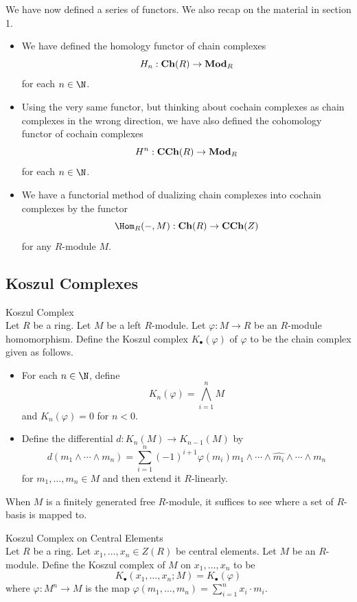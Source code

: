 \documentclass[a4paper]{article}
\begin{document}
We have now defined a series of functors. We also recap on the material in section 1. 
\begin{itemize}
\item We have defined the homology functor of chain complexes $$H_n:\bold{Ch}(R)\to\bold{Mod}_R$$ for each $n\in\N$. 
\item Using the very same functor, but thinking about cochain complexes as chain complexes in the wrong direction, we have also defined the cohomology functor of cochain complexes $$H^n:\bold{CCh}(R)\to\bold{Mod}_R$$ for each $n\in\N$. 
\item We have a functorial method of dualizing chain complexes into cochain complexes by the functor $$\Hom_R(-,M):\bold{Ch}(R)\to\bold{CCh}(Z)$$ for any $R$-module $M$. 
\end{itemize}

\subsection{Koszul Complexes}
\begin{defn}{Koszul Complex}{}\\
Let $R$ be a ring. Let $M$ be a left $R$-module. Let $\varphi:M\to R$ be an $R$-module homomorphism. Define the Koszul complex $K_\bullet(\varphi)$ of $\varphi$ to be the chain complex given as follows. 
\begin{itemize}
\item For each $n\in\N$, define $$K_n(\varphi)=\bigwedge_{i=1}^nM$$ and $K_n(\varphi)=0$ for $n<0$. 
\item Define the differential $d:K_n(M)\to K_{n-1}(M)$ by $$d(m_1\wedge\cdots\wedge m_n)=\sum_{i=1}^n(-1)^{i+1}\varphi(m_i)m_1\wedge\cdots\wedge\widehat{m_i}\wedge\cdots\wedge m_n$$ for $m_1,\dots,m_n\in M$ and then extend it $R$-linearly. 
\end{itemize}
\end{defn}

When $M$ is a finitely generated free $R$-module, it suffices to see where a set of $R$-basis is mapped to. 

\begin{defn}{Koszul Complex on Central Elements}{}\\
Let $R$ be a ring. Let $x_1,\dots,x_n\in Z(R)$ be central elements. Let $M$ be an $R$-module. Define the Koszul complex of $M$ on $x_1,\dots,x_n$ to be $$K_\bullet(x_1,\dots,x_n;M)=K_\bullet(\varphi)$$ where $\varphi:M^n\to M$ is the map $\varphi(m_1,\dots,m_n)=\sum_{i=1}^nx_i\cdot m_i$. 
\end{defn}
\end{document}
